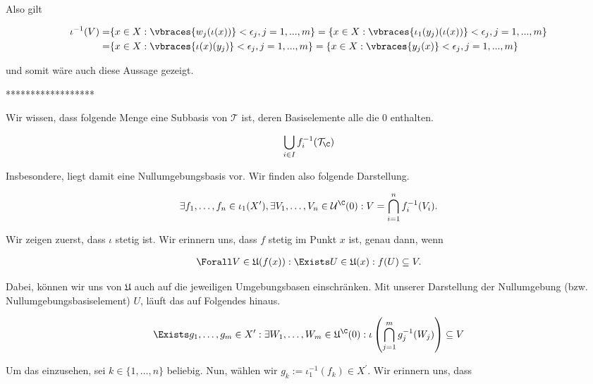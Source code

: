 \begin{solution}
\begin{enumerate}[label = (\arabic*)]
  Also gilt

  \begin{align*}
    \iota^{-1}(V) =& \{x \in X: \vbraces{w_{j}(\iota(x))}<\epsilon_j, j=1,...,m\} = \{x \in X: \vbraces{\iota_1(y_{j})(\iota(x))}<\epsilon_j, j=1,...,m\} \\
    =& \{x \in X: \vbraces{\iota(x)(y_j)}<\epsilon_j, j=1,...,m\} = \{x \in X: \vbraces{y_j(x)}<\epsilon_j, j=1,...,m\}
  \end{align*}

  und somit wäre auch diese Aussage gezeigt.

  ******************

  Wir wissen, dass folgende Menge eine Subbasis von $\mathcal{T}$ ist, deren Basiselemente alle die $0$ enthalten.

  \begin{align*}
    \bigcup_{i \in I}f_i^{-1}(\mathcal{T}_{\C})
  \end{align*}

  Insbesondere, liegt damit eine Nullumgebungsbasis vor.
  Wir finden also folgende Darstellung.

  \begin{align*}
    \exists f_1,\dots,f_n \in \iota_1(X^{\prime}), \exists V_1,\dots,V_n \in \mathcal{U}^{\C}(0):
    V = \bigcap_{i=1}^n f_i^{-1}(V_i).
  \end{align*}

  Wir zeigen zuerst, dass $\iota$ stetig ist.
  Wir erinnern uns, dass $f$ stetig im Punkt $x$ ist, genau dann, wenn

  \begin{align*}
    \Forall V \in \mathfrak{U}(f(x)):
    \Exists U \in \mathfrak{U}(x):
    f(U) \subseteq V.
  \end{align*}

  Dabei, können wir uns von $\mathfrak{U}$ auch auf die jeweiligen Umgebungsbasen einschränken.
  Mit unserer Darstellung der Nullumgebung (bzw. Nullumgebungsbasiselement) $U$, läuft das auf Folgendes hinaus.

  \begin{align*}
    \Exists g_1, \dots, g_m \in X^{\prime}:
    \exists W_1, \dots, W_m \in \mathfrak{U}^\C(0):
    \iota\left(\bigcap_{j=1}^m g_j^{-1}(W_j)\right) \subseteq V
  \end{align*}

  Um das einzusehen, sei $k \in \{1,\dots,n\}$ beliebig.
  Nun, wählen wir $g_k := \iota_1^{-1}(f_k) \in X^{\prime}$.
  Wir erinnern uns, dass


\end{enumerate}
\end{solution}
